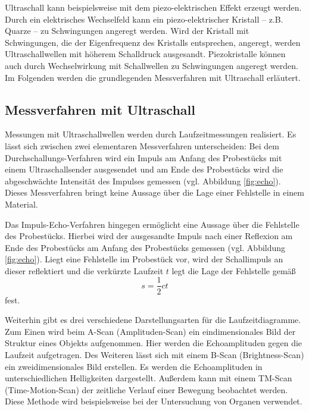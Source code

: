Ultraschall kann beispielsweise mit dem piezo-elektrischen Effekt erzeugt werden.
Durch ein elektrisches Wechselfeld kann ein piezo-elektrischer Kristall -- z.B. Quarze -- zu
Schwingungen angeregt werden. Wird der Kristall mit
Schwingungen, die der Eigenfrequenz des Kristalls entsprechen, angeregt, werden
Ultraschallwellen mit höherem Schalldruck ausgesandt. Piezokristalle können auch durch
Wechselwirkung mit Schallwellen zu Schwingungen angeregt werden.
Im Folgenden werden die grundlegenden Messverfahren mit Ultraschall erläutert.
\subsection{Messverfahren mit Ultraschall}
Messungen mit Ultraschallwellen werden durch Laufzeitmessungen realisiert.
Es lässt sich zwischen zwei elementaren Messverfahren unterscheiden:
Bei dem Durchschallungs-Verfahren wird ein Impuls am Anfang des Probestücks mit einem 
Ultraschallsender ausgesendet
und am Ende des Probestücks wird die abgeschwächte Intensität des Impulses gemessen (vgl.
Abbildung \ref{fig:echo}).
Dieses Messverfahren bringt keine Aussage über die Lage einer Fehlstelle in einem
Material. 

Das Impuls-Echo-Verfahren hingegen ermöglicht eine Aussage über die Fehlstelle des Probestücks.
Hierbei wird der ausgesandte Impuls nach einer Reflexion am Ende des Probestücks am Anfang des
Probestücks gemessen (vgl. Abbildung \ref{fig:echo}).
Liegt eine Fehlstelle im Probestück vor, wird der Schallimpuls an dieser reflektiert und die
verkürzte Laufzeit $t$ legt die Lage der Fehlstelle gemäß
\begin{equation}
	\label{eqn:laufzeit}
	s = \frac{1}{2} c t
\end{equation}
fest.

Weiterhin gibt es drei verschiedene Darstellungsarten für die Laufzeitdiagramme.
Zum Einen wird beim A-Scan (Amplituden-Scan) ein eindimensionales Bild der Struktur eines 
Objekts aufgenommen. Hier werden die Echoamplituden gegen die Laufzeit aufgetragen. Des Weiteren
lässt sich mit einem B-Scan (Brightness-Scan) ein zweidimensionales Bild erstellen. Es werden
die Echoamplituden in unterschiedlichen Helligkeiten dargestellt.
Außerdem kann mit einem TM-Scan (Time-Motion-Scan) der zeitliche Verlauf einer Bewegung 
beobachtet werden. Diese Methode wird beispielsweise bei der Untersuchung von Organen verwendet.
\FloatBarrier
